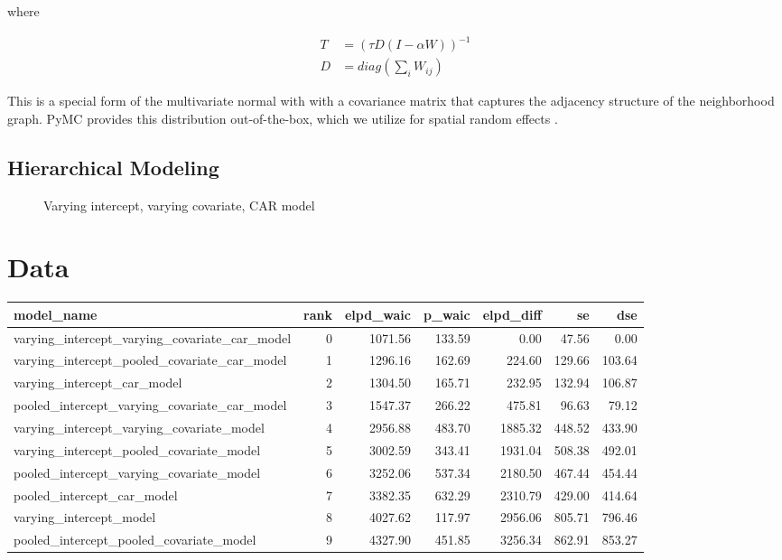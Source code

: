 \documentclass[notitlepage]{article}
\begin{document}
where

\begin{equation}
\begin{aligned}
    T &= (\tau D (I-\alpha W))^{-1} \\
    D &= diag(\sum_{i} W_{ij})
\end{aligned}
\end{equation}


This is a special form of the multivariate normal with with a covariance matrix that captures the adjacency structure of the neighborhood graph. 
PyMC provides this distribution out-of-the-box, which we utilize for spatial random effects \cite{salvatier_probabilistic_2016}.


\subsection{Hierarchical Modeling}

\begin{figure}[hbt!]
\centering

\caption{Varying intercept, varying covariate, CAR model}
\end{figure}

\section{Data}

\begin{tabular}{lrrrrrr}
\toprule
model\_name &  rank &  elpd\_waic &  p\_waic &  elpd\_diff &      se &     dse \\
\midrule
varying\_intercept\_varying\_covariate\_car\_model &     0 &    1071.56 &  133.59 &       0.00 &   47.56 &    0.00 \\
varying\_intercept\_pooled\_covariate\_car\_model  &     1 &    1296.16 &  162.69 &     224.60 &  129.66 &  103.64 \\
varying\_intercept\_car\_model                   &     2 &    1304.50 &  165.71 &     232.95 &  132.94 &  106.87 \\
pooled\_intercept\_varying\_covariate\_car\_model  &     3 &    1547.37 &  266.22 &     475.81 &   96.63 &   79.12 \\
varying\_intercept\_varying\_covariate\_model     &     4 &    2956.88 &  483.70 &    1885.32 &  448.52 &  433.90 \\
varying\_intercept\_pooled\_covariate\_model      &     5 &    3002.59 &  343.41 &    1931.04 &  508.38 &  492.01 \\
pooled\_intercept\_varying\_covariate\_model      &     6 &    3252.06 &  537.34 &    2180.50 &  467.44 &  454.44 \\
pooled\_intercept\_car\_model                    &     7 &    3382.35 &  632.29 &    2310.79 &  429.00 &  414.64 \\
varying\_intercept\_model                       &     8 &    4027.62 &  117.97 &    2956.06 &  805.71 &  796.46 \\
pooled\_intercept\_pooled\_covariate\_model       &     9 &    4327.90 &  451.85 &    3256.34 &  862.91 &  853.27 \\
\bottomrule
\end{tabular}
\end{document}
